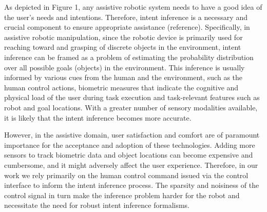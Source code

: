 As depicted in Figure 1, any assistive robotic system needs to have a good idea of the user's needs and intentions. Therefore, intent inference is a necessary and crucial component to ensure appropriate assistance (reference). Specifically, in assistive robotic manipulation, since the robotic device is primarily used for reaching toward and grasping of discrete objects in the environment, intent inference can be framed as a problem of estimating the probability distribution over all possible goals (objects) in the environment. This inference is usually informed by various cues from the human and the environment, such as the human control actions, biometric measures that indicate the cognitive and physical load of the user during task execution and task-relevant features such as robot and goal locations. With a greater number of sensory modalities available, it is likely that the intent inference becomes more accurate. 

However, in the assistive domain, user satisfaction and comfort are of paramount importance for the acceptance and adoption of these technologies. Adding more sensors to track biometric data and object locations can become expensive and cumbersome, and it might adversely affect the user experience. Therefore, in our work we rely primarily on the human control command issued via the control interface to inform the intent inference process. The sparsity and noisiness of the control signal in turn make the inference problem harder for the robot and necessitate the need for robust intent inference formalisms. 

